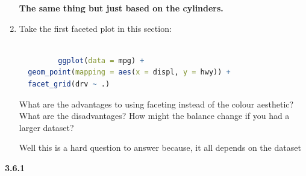 \documentclass[11pt]{article}
\begin{document}
\begin{enumerate}
\begin{lstlisting}[language=R]
         \end{lstlisting}
\textbf{The same thing but just based on the cylinders.}


\item Take the first faceted plot in this section:

  \begin{lstlisting}[language=R]
         
         ggplot(data = mpg) + 
  geom_point(mapping = aes(x = displ, y = hwy)) +
  facet_grid(drv ~ .)

         \end{lstlisting}
         
What are the advantages to using faceting instead of the colour aesthetic? What are the disadvantages? How might the balance change if you had a larger dataset?

Well this is a hard question to answer because, it all depends on the dataset 



      \end{enumerate}
      \newpage
      
\noindent\textbf{3.6.1}
      
\end{document}
